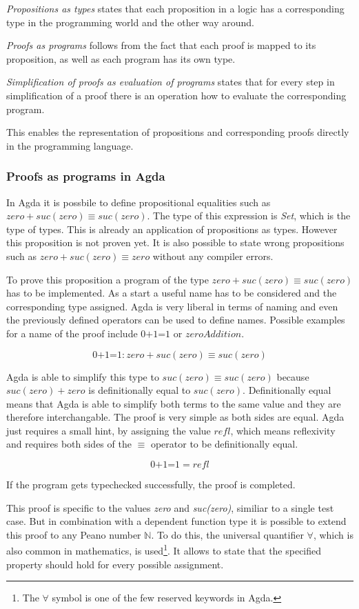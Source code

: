 \emph{Propositions as types} states that each proposition in a logic has a corresponding type in the programming world and the other way around. 

\emph{Proofs as programs} follows from the fact that each proof is mapped to its proposition, as well as each program has its own type.

\emph{Simplification of proofs as evaluation of programs} states that for every step in simplification of a proof there is an operation how to evaluate the corresponding program.

This enables the representation of propositions and corresponding proofs directly in the programming language.

\subsubsection{Proofs as programs in Agda}
In Agda it is possbile to define propositional equalities such as $zero + suc(zero) \equiv suc(zero)$. The type of this expression is \emph{Set}, which is the type of types.
This is already an application of propositions as types.
However this proposition is not proven yet.
It is also possible to state wrong propositions such as $zero + suc(zero) \equiv zero$ without any compiler errors.

To prove this proposition a program of the type $zero + suc(zero) \equiv suc(zero)$ has to be implemented.
As a start a useful name has to be considered and the corresponding type assigned.
Agda is very liberal in terms of naming and even the previously defined operators can be used to define names.
Possible examples for a name of the proof include $\text{0+1=1}$ or $zeroAddition$.

$$\text{0+1=1} : zero + suc(zero) \equiv suc(zero)$$

Agda is able to simplify this type to $suc(zero) \equiv suc(zero)$ because $suc(zero) + zero$ is definitionally equal to $suc(zero)$. Definitionally equal means that Agda is able to simplify both terms to the same value and they are therefore interchangable.
The proof is very simple as both sides are equal. 
Agda just requires a small hint, by assigning the value $refl$, which means reflexivity and requires both sides of the $\equiv$ operator to be definitionally equal.

$$\text{0+1=1} = refl$$

If the program gets typechecked successfully, the proof is completed.

This proof is specific to the values \emph{zero} and \emph{suc(zero)}, similiar to a single test case.
But in combination with a dependent function type it is possible to extend this proof to any Peano number $\mathbb{N}$. 
To do this, the universal quantifier $\forall$, which is also common in mathematics, is used\footnote{The $\forall$ symbol is one of the few reserved keywords in Agda.}.
It allows to state that the specified property should hold for every possible assignment\cite{plfa2019}.

